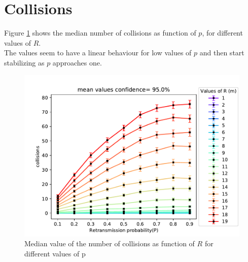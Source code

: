 \section{Collisions}
Figure \ref{fig:collisionsPR} shows the median number of collisions as function of $p$, for different values of $R$.\\
The values seem to have a linear behaviour for low values of $p$ and then start stabilizing as $p$ approaches one.
\begin{figure}[H]
    \begin{center}
        \includegraphics[scale=.7,trim={0 0 0 0.8cm},clip]{img/big_collisions_p_mean_95.0.pdf}
    \end{center}
    \vspace*{-0.5cm}
    \caption{Median value of the number of collisions as function of $R$ for different values of p}
    \label{fig:collisionsPR}
\end{figure}

